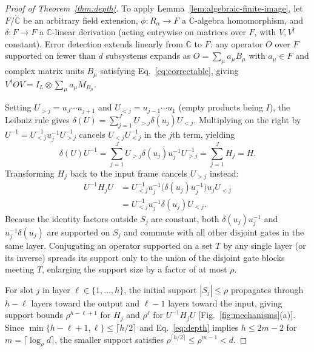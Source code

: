 \documentclass[aps,prl,reprint,notitlepage,nofootinbib,nobibnotes]{revtex4-2}
\newcommand{\id}{I}
\begin{document}
\begin{proof}[Proof of Theorem~\ref{thm:depth}]
To apply Lemma~\ref{lem:algebraic-finite-image}, let \(F/\mathbb C\) be an arbitrary field extension, \(\phi:R_\alpha\to F\) a \(\mathbb C\)-algebra homomorphism, and \(\delta:F\to F\) a \(\mathbb C\)-linear derivation (acting entrywise on matrices over \(F\), with \(V,V^\dagger\) constant). Error detection extends linearly from \(\mathbb C\) to \(F\): any operator \(O\) over \(F\) supported on fewer than \(d\) subsystems expands as \(O=\sum_\mu a_\mu B_\mu\) with \(a_\mu\in F\) and complex matrix units \(B_\mu\) satisfying Eq.~\eqref{eq:correctable}, giving \(V^\dagger OV=\id_L\otimes\sum_\mu a_\mu M_{B_\mu}\).

Setting \(U_{>j}=u_J\cdots u_{j+1}\) and \(U_{<j}=u_{j-1}\cdots u_1\) (empty products being \(\id\)), the Leibniz rule gives \(\delta(U)=\sum_{j=1}^J U_{>j}\delta(u_j)U_{<j}\). Multiplying on the right by \(U^{-1}=U_{<j}^{-1}u_j^{-1}U_{>j}^{-1}\) cancels \(U_{<j}U_{<j}^{-1}\) in the \(j\)th term, yielding
\begin{equation}\label{eq:generator}
 \delta(U)U^{-1}=\sum_{j=1}^JU_{>j}\delta(u_j)u_j^{-1}U_{>j}^{-1}=\sum_{j=1}^J H_j=H.
\end{equation}
Transforming \(H_j\) back to the input frame cancels \(U_{>j}\) instead:
\[
 \begin{aligned}
 U^{-1}H_jU
 &=U_{<j}^{-1}u_j^{-1}\bigl(\delta(u_j)u_j^{-1}\bigr)u_jU_{<j}\\
 &=U_{<j}^{-1}u_j^{-1}\delta(u_j)U_{<j}.
 \end{aligned}
\]
Because the identity factors outside \(S_j\) are constant, both \(\delta(u_j)u_j^{-1}\) and \(u_j^{-1}\delta(u_j)\) are supported on \(S_j\) and commute with all other disjoint gates in the same layer. Conjugating an operator supported on a set \(T\) by any single layer (or its inverse) spreads its support only to the union of the disjoint gate blocks meeting \(T\), enlarging the support size by a factor of at most \(\rho\).

For slot \(j\) in layer \(\ell\in\{1,\ldots,h\}\), the initial support \(|S_j|\le\rho\) propagates through \(h-\ell\) layers toward the output and \(\ell-1\) layers toward the input, giving support bounds \(\rho^{h-\ell+1}\) for \(H_j\) and \(\rho^\ell\) for \(U^{-1}H_jU\) [Fig.~\ref{fig:mechanisms}(a)]. Since \(\min\{h-\ell+1,\ell\}\le\lceil h/2\rceil\) and Eq.~\eqref{eq:depth} implies \(h\le 2m-2\) for \(m=\lceil\log_\rho d\rceil\), the smaller support satisfies \(\rho^{\lceil h/2\rceil}\le\rho^{m-1}<d\).


\end{proof}
\end{document}
